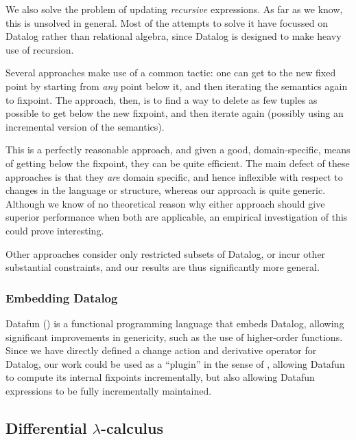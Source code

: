 We also solve the problem of updating \emph{recursive} expressions. As far as we
know, this is unsolved in general. Most of the attempts to solve it have
focussed on Datalog rather than relational algebra, since Datalog is designed to
make heavy use of recursion.

Several approaches
\autocites{gupta1993maintaining}{harrison1992maintenance}
make use of a common tactic: one can get to the new fixed
point by starting from \emph{any} point below it, and then iterating the
semantics again to fixpoint. The approach, then, is to find a way to delete as
few tuples as possible to get below the new fixpoint, and then iterate again
(possibly using an incremental version of the semantics).

This is a perfectly reasonable approach, and given a good, domain-specific,
means of getting below the fixpoint, they can be quite efficient.
The main defect of these approaches is that they \emph{are} domain specific,
and hence inflexible with respect to changes in the language or structure,
whereas our approach is quite generic. Although we know of no theoretical reason
why either approach should give superior performance when both are applicable,
an empirical investigation of this could prove interesting.

Other approaches \autocites{dong2000incremental}{urpi1992method} consider only
restricted subsets of Datalog, or incur other substantial constraints, and our results
are thus significantly more general.

\subsubsection{Embedding Datalog}
\label{sec:embeddingDatalog}

Datafun (\textcite{arntz2016datafun}) is a functional programming language that embeds
Datalog, allowing significant improvements in genericity, such as the use of
higher-order functions. Since we have directly defined a change action and
derivative operator for Datalog, our work could be used as a ``plugin'' in the sense
of \citeauthor{cai2014changes}, allowing Datafun to compute its internal fixpoints
incrementally, but also allowing Datafun expressions to be fully incrementally maintained.

\subsection{Differential $\lambda$-calculus}

